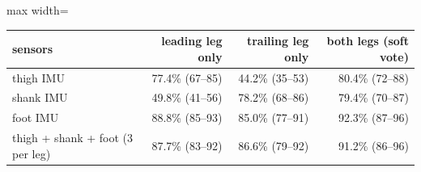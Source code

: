 \begin{adjustbox}{max width=\textwidth}
{\footnotesize
\begin{tabular}{p{4.6cm}rrr}
\toprule
\textbf{sensors} & \textbf{leading leg only} & \textbf{trailing leg only} & \textbf{both legs (soft vote)} \\
\midrule
thigh IMU & 77.4\% (67--85) & 44.2\% (35--53) & 80.4\% (72--88) \\
shank IMU & 49.8\% (41--56) & 78.2\% (68--86) & 79.4\% (70--87) \\
foot IMU & 88.8\% (85--93) & 85.0\% (77--91) & 92.3\% (87--96) \\
thigh + shank + foot (3 per leg) & 87.7\% (83--92) & 86.6\% (79--92) & 91.2\% (86--96) \\
\bottomrule
\end{tabular}
}
\end{adjustbox}

